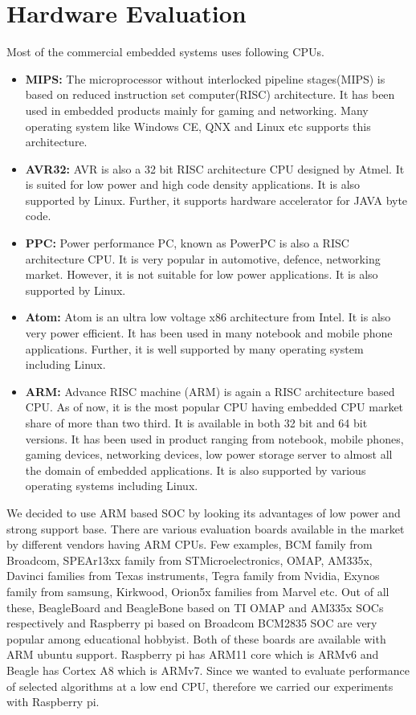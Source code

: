 \section {Hardware Evaluation}
\indent Most of the commercial embedded systems uses following CPUs.
\begin{itemize}
 \item \textbf{MIPS:} The microprocessor without interlocked
 pipeline stages(MIPS) is based on reduced instruction
 set computer(RISC) architecture. It has been used in
 embedded products mainly for gaming and networking. Many
 operating system like Windows CE, QNX and Linux etc
 supports this architecture.
 \item \textbf{AVR32:} AVR is also a 32 bit RISC architecture CPU
 designed by Atmel. It is suited for low power and high
 code density applications. It is also supported by
 Linux. Further, it supports hardware accelerator for
 JAVA byte code.
 \item \textbf{PPC:} Power performance PC, known as PowerPC is
 also a RISC architecture CPU. It is very popular in
 automotive, defence, networking market. However, it is not
 suitable for low power applications. It is also
 supported by Linux.
 \item \textbf{Atom:} Atom is an ultra low voltage x86
 architecture from Intel. It is also very power
 efficient. It has been used in many notebook and mobile
 phone applications. Further, it is well supported by many
 operating system including Linux.
 \item \textbf{ARM:} Advance RISC machine (ARM) is again a RISC
 architecture based CPU. As of now, it is the most
 popular CPU having embedded CPU market share of more
 than two third. It is available in both 32 bit and 64
 bit versions. It has been used in product ranging from
 notebook, mobile phones, gaming devices, networking
 devices, low power storage server to almost all the
 domain of embedded applications. It is also supported by
 various operating systems including Linux.
\end{itemize}
We decided to use ARM based SOC by looking its advantages of low power
and strong support base. There are various evaluation boards available
in the market by different vendors having ARM CPUs. Few examples, BCM
family from Broadcom, SPEAr13xx family from STMicroelectronics, OMAP,
AM335x, Davinci families from Texas instruments, Tegra family from
Nvidia, Exynos family from samsung, Kirkwood, Orion5x families from
Marvel etc. Out of all these, BeagleBoard and BeagleBone based on TI
OMAP and AM335x SOCs respectively and Raspberry pi based on Broadcom
BCM2835 SOC are very popular among educational hobbyist. Both of these
boards are available with ARM ubuntu support. Raspberry pi has ARM11
core which is ARMv6 and Beagle has Cortex A8 which is ARMv7. Since we
wanted to evaluate performance of selected algorithms at a low end CPU,
therefore we carried our experiments with Raspberry pi.
